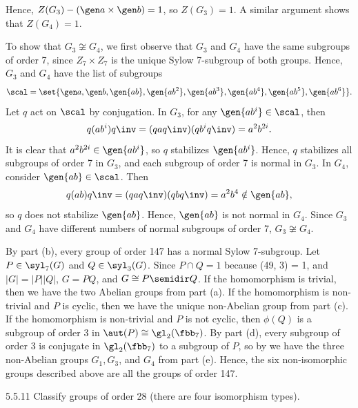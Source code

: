 \begin{solenum}[spsol]
	Hence, $Z(G_3) - (\gen a \times \gen b) = 1$, so $Z(G_3) = 1$.
	A similar argument shows that $Z(G_4) = 1$.
    \item To show that $G_3 \not\cong G_4$, we first observe that $G_3$ and $G_4$ have the same subgroups of order 7, since $Z_7 \times Z_7$ is the unique Sylow 7-subgroup of both groups.
	Hence, $G_3$ and $G_4$ have the list of subgroups
    \[
    	\scal = \set{\gen a, \gen b, \gen{ab}, \gen{ab^2}, \gen{ab^3}, \gen{ab^4}, \gen{ab^5}, \gen{ab^6}}.
    \]
    Let $q$ act on $\scal$ by conjugation.
	In $G_3$, for any $\gen{ab^i} \in \scal$, then
    \[
    	q(ab^i)q\inv = (qaq\inv)(qb^iq\inv) = a^2b^{2i}.
    \]
    It is clear that $a^2b^{2i} \in \gen{ab^i}$, so $q$ stabilizes $\gen{ab^i}$.
	Hence, $q$ stabilizes all subgroups of order 7 in $G_3$, and each subgroup of order 7 is normal in $G_3$.
	In $G_4$, consider $\gen{ab} \in \scal$.
	Then
    \[
    	q(ab)q\inv = (qaq\inv)(qbq\inv) = a^2b^4 \notin \gen{ab},
    \]
    so $q$ does not stabilize $\gen{ab}$.
	Hence, $\gen{ab}$ is not normal in $G_4$.
	Since $G_3$ and $G_4$ have different numbers of normal subgroups of order 7, $G_3 \not\cong G_4$.
    \item By part (b), every group of order 147 has a normal Sylow 7-subgroup.
	Let $P \in \syl_7(G)$ and $Q \in \syl_3(G)$.
	Since $P \cap Q = 1$ because (49, 3) = 1, and $|G| = |P||Q|$, $G = PQ$, and $G \cong P \semidir Q$.
	If the homomorphism is trivial, then we have the two Abelian groups from part (a).
	If the homomorphism is non-trivial and $P$ is cyclic, then we have the unique non-Abelian group from part (c).
	If the homomorphism is non-trivial and $P$ is not cyclic, then $\phi(Q)$ is a subgroup of order 3 in $\aut(P) \cong \gl_2(\fbb_7)$.
	By part (d), every subgroup of order 3 is conjugate in $\gl_2(\fbb_7)$ to a subgroup of $P$, so by  we have the three non-Abelian groups $G_1, G_3$, and $G_4$ from part (e).
	Hence, the six non-isomorphic groups described above are all the groups of order 147.
\end{solenum}

\begin{exercise}{5.5.11}
    Classify groups of order 28 (there are four isomorphism types).
\end{exercise}

